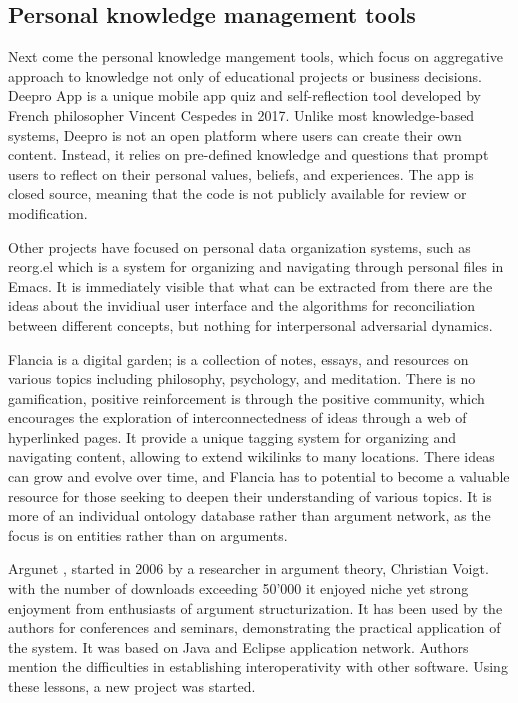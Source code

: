 \documentclass{report}
\begin{document}
\subsection{Personal knowledge management tools}
Next come the personal knowledge mangement tools, which focus on aggregative approach to knowledge not only of educational projects or business decisions.
Deepro App \cite{noauthor_deepro_nodate} is a unique mobile app quiz and self-reflection tool developed by French philosopher Vincent Cespedes \cite{noauthor_vincent_2023} in 2017. Unlike most knowledge-based systems, Deepro is not an open platform where users can create their own content. Instead, it relies on pre-defined knowledge and questions that prompt users to reflect on their personal values, beliefs, and experiences. The app is closed source, meaning that the code is not publicly available for review or modification.

Other projects have focused on personal data organization systems, such as reorg.el \cite{noauthor_reorg_2023} which is a system for organizing and navigating through personal files in Emacs. It is immediately visible that what can be extracted from there are the ideas about the invidiual user interface and the algorithms for reconciliation between different concepts, but nothing for interpersonal adversarial dynamics.

Flancia \cite{flancian_welcome_2019} is a digital garden; is a collection of notes, essays, and resources on various topics including philosophy, psychology, and meditation. There is no gamification, positive reinforcement is through the positive community, which encourages the exploration of interconnectedness of ideas through a web of hyperlinked pages. It provide a unique tagging system for organizing and navigating content, allowing to extend wikilinks to many locations. There ideas can grow and evolve over time, and Flancia has to potential to become a valuable resource for those seeking to deepen their understanding of various topics. It is more of an individual ontology database rather than argument network, as the focus is on entities rather than on arguments.

Argunet \cite{noauthor_argunet_2018}, started in 2006 by a researcher in argument theory, Christian Voigt. with the number of downloads exceeding 50'000 it enjoyed niche yet strong enjoyment from enthusiasts of argument structurization. It has been used by the authors for conferences and seminars, demonstrating the practical application of the system. It was based on Java and Eclipse application network. Authors mention the difficulties in establishing interoperativity with other software. Using these lessons, a new project was started.
\end{document}
